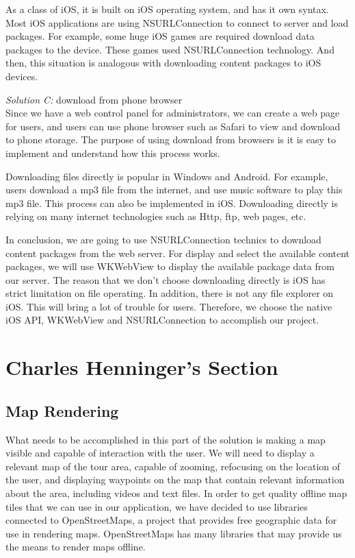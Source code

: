 \documentclass[letterpaper, 10pt,titlepage]{article}
\begin{document}
As a class of iOS, it is built on iOS operating system, and has it own syntax. Most iOS applications are using NSURLConnection to connect to server and load packages. For example, some huge iOS games are required download data packages to the device. These games used NSURLConnection technology. And then, this situation is analogous with downloading content packages to iOS devices. 


\textit{Solution C:} download from phone browser \\
Since we have a web control panel for administrators, we can create a web page for users, and users can use phone browser such as Safari to view and download to phone storage. The purpose of using download from browsers is it is easy to implement and understand how this process works.


Downloading files directly is popular in Windows and Android. For example, users download a mp3 file from the internet, and use music software to play this mp3 file. This process can also be implemented in iOS. Downloading directly is relying on many internet technologies such as Http, ftp, web pages, etc. 


In conclusion, we are going to use NSURLConnection technics to download content packages from the web server. For display and select the available content packages, we will use WKWebView to display the available package data from our server. The reason that we don’t choose downloading directly is iOS has strict limitation on file operating. In addition, there is not any file explorer on iOS. This will bring a lot of trouble for users. Therefore, we choose the native iOS API, WKWebView and NSURLConnection to accomplish our project.

\vspace{0.5cm}


\section{Charles Henninger's Section}
\subsection{Map Rendering}
What needs to be accomplished in this part of the solution is making a map visible and capable of interaction with the user. We will need to display a relevant map of the tour area, capable of zooming, refocusing on the location of the user, and displaying waypoints on the map that contain relevant information about the area, including videos and text files. In order to get quality offline map tiles that we can use in our application, we have decided to use libraries connected to OpenStreetMaps, a project that provides free geographic data for use in rendering maps. OpenStreetMaps has many libraries that may provide us the means to render maps offline.
\end{document}
